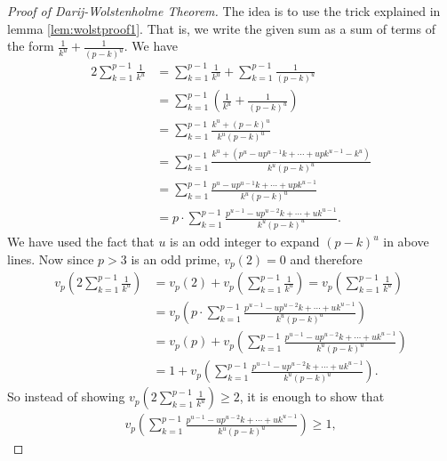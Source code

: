 \documentclass{subfile}
\begin{document}
	\begin{proof}[Proof of Darij-Wolstenholme Theorem]
		The idea is to use the trick explained in lemma \eqref{lem:wolstproof1}. That is, we write the given sum as a sum of terms of the form $\frac{1}{k^u}+\frac{1}{(p-k)^u}$. We have
		\begin{align*}
		2\sum_{k = 1}^{p - 1}\frac {1}{k^{u}} &= \sum_{k = 1}^{p - 1}\frac {1}{k^{u}} + \sum_{k = 1}^{p - 1}\frac {1}{\left(p - k\right)^{u}}\\
		&= \sum_{k = 1}^{p - 1}\left(\frac {1}{k^{u}} + \frac {1}{\left(p - k\right)^{u}}\right) \\
		&= \sum_{k = 1}^{p - 1}\frac {k^{u} + \left(p - k\right)^{u}}{k^{u}\left(p - k\right)^{u}}\\
		&=\sum_{k = 1}^{p - 1}\frac {k^{u} + \left(p^{u} - up^{u - 1}k+ \cdots + upk^{u - 1} - k^{u}\right)}{k^{u}\left(p - k\right)^{u}} \\
		&= \sum_{k = 1}^{p - 1}\frac {p^{u} - up^{u - 1}k + \cdots + upk^{u - 1}}{k^{u}\left(p - k\right)^{u}}\\
		&=p \cdot \sum_{k = 1}^{p - 1}\frac {p^{u - 1} - up^{u - 2}k+\cdots + uk^{u - 1}}{k^{u}\left(p - k\right)^{u}}.
		\end{align*}
		We have used the fact that $u$ is an odd integer to expand $(p-k)^u$ in above lines. Now since $p>3$ is an odd prime, $v_p(2)=0$ and therefore
		\begin{align*}
		v_{p}\left(2\sum_{k = 1}^{p - 1}\frac {1}{k^{u}}\right) &= v_{p}\left(2\right) + v_{p}\left(\sum_{k = 1}^{p - 1}\frac {1}{k^{u}}\right)= v_{p}\left(\sum_{k = 1}^{p - 1}\frac {1}{k^{u}}\right)\\
		&=v_{p}\left(p \cdot \sum_{k = 1}^{p - 1}\frac {p^{u - 1} - up^{u - 2}k+\cdots + uk^{u - 1}}{k^{u}\left(p - k\right)^{u}}\right)\\
		&=v_{p}\left(p\right) + v_{p}\left(\sum_{k = 1}^{p - 1}\frac {p^{u - 1} - up^{u - 2}k+\cdots + uk^{u - 1}}{k^{u}\left(p - k\right)^{u}}\right)\\
		&=1+v_{p}\left(\sum_{k = 1}^{p - 1}\frac {p^{u - 1} - up^{u - 2}k+\cdots + uk^{u - 1}}{k^{u}\left(p - k\right)^{u}}\right).
		\end{align*}
		So instead of showing $v_{p}\left(2\sum_{k = 1}^{p - 1}\frac {1}{k^{u}}\right) \geq 2$, it is enough to show that
		\begin{align*}
		v_{p}\left(\sum_{k = 1}^{p - 1}\frac {p^{u - 1} - up^{u - 2}k+\cdots + uk^{u - 1}}{k^{u}\left(p - k\right)^{u}}\right) \geq 1,
		\end{align*}

\end{proof}
\end{document}
